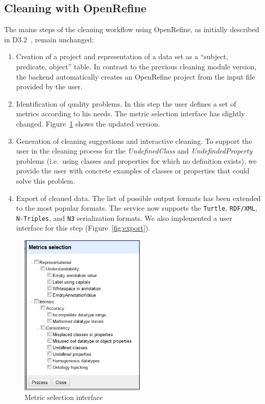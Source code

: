 \subsection{Cleaning with OpenRefine}
\label{sec:openrefine}

The mains steps of the cleaning workflow using OpenRefine, as initially described in D3.2~\cite{d3.2}, remain unchanged:
\begin{enumerate}
\item Creation of a project and representation of a data set as a “subject, predicate, object” table. In contrast to the previous cleaning module version, the backend automatically creates an OpenRefine project from the input file provided by the user. 
\item Identification of quality problems.  In this step the user defines a set of metrics according to his needs. The metric selection interface has slightly changed.  Figure~\ref{fig:metric_selection} shows the updated version.
\item Generation of cleaning suggestions and interactive cleaning.   To support the user in the cleaning process for the \textit{UndefinedClass} and \textit{UndefindedProperty} problems (i.e.\ using classes and properties for which no definition exists), we provide the user with concrete examples of classes or properties that could solve this problem. 
\item Export of cleaned data. The list of possible output formats has been extended to the most popular formats. The service now supports the \texttt{Turtle}, \texttt{RDF/XML}, \texttt{N-Triples}, and \texttt{N3} serialization formats.  We also implemented a user interface for this step (Figure~\ref{fig:export}).
\end{enumerate}




\begin{figure}[ht!]
\centering
\includegraphics[width=6cm]{figures/MetricSelection.png}
\caption{Metric selection interface}
\label{fig:metric_selection}
\end{figure}



